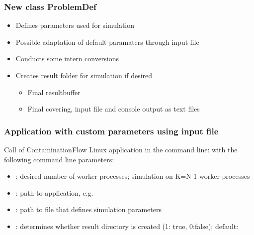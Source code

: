 \subsubsection{New class ProblemDef}
\begin{itemize}[noitemsep,topsep=0pt]
\item Defines parameters used for simulation
\item Possible adaptation of default paramaters through input file
\item Conducts some intern conversions
\item Creates result folder for simulation if desired
	\begin{itemize}[noitemsep,topsep=0pt]
	\item Final resultbuffer
	\item Final covering, input file and console output as text files
	\end{itemize}
\end{itemize}
\bigskip

\subsubsection{Application with custom parameters using input file}
Call of ContaminationFlow Linux application in the command line:
\smallskip
with the following command line parameters:
\begin{itemize}[noitemsep,topsep=0pt]
\item {}: desired number of worker processes; simulation on K=N-1 worker processes
\item {}: path to application, e.g.\ 
\item {}: path to file that defines simulation parameters
\item {}: determines whether result directory is created (1: true, 0:false); default:
\end{itemize}
\bigskip

